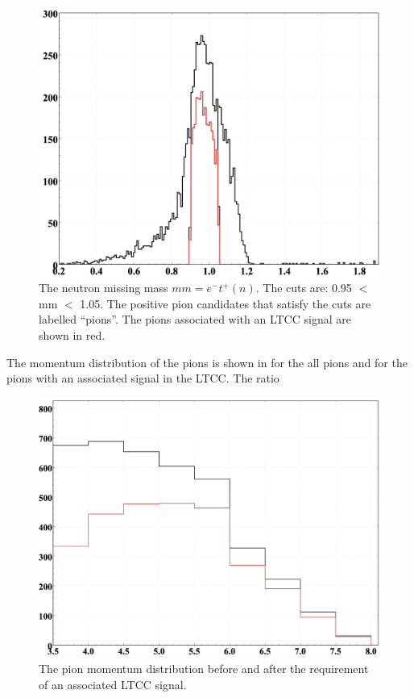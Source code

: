 \begin{figure}
	\centering
	\includegraphics[width=0.98\columnwidth,keepaspectratio]{img/detFiducialCut.png}
	\caption{The neutron missing mass $mm = e^-t^+(n)$. The cuts are: 0.95 $<$ mm $<$ 1.05.
	         The positive pion candidates that satisfy the cuts are labelled “pions”.
				The pions associated with an LTCC signal are shown in red.}
	\label{fig:neutronMM}
\end{figure}

The momentum distribution of the pions is shown in  for the all pions and for the pions
with an associated signal in the LTCC. The ratio


\begin{figure}
	\centering
	\includegraphics[width=0.98\columnwidth,keepaspectratio]{img/pionMomentum.png}
	\caption{The pion momentum distribution before and after the requirement of an associated LTCC signal. }
	\label{fig:pionMomentum}
\end{figure}


